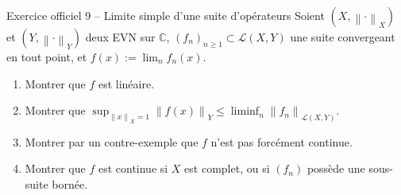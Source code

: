 \documentclass[11pt,a4paper]{article}
\newcommand{\C}{\mathbb{C}}
\newcommand{\norm}[1]{\left\|#1\right\|}
\newcommand{\Lc}{\mathcal{L}}
\theoremstyle{definition}
\begin{document}
\begin{exo}{Exercice officiel 9 -- Limite simple d'une suite d'opérateurs}
Soient $(X,\norm\cdot_X)$ et $(Y,\norm\cdot_Y)$ deux EVN sur $\C$, $(f_n)_{n\ge1}\subset\Lc(X,Y)$ une suite convergeant en tout point, et $f(x):=\lim_nf_n(x)$.
\begin{enumerate}[label=(\alph*)]
  \item Montrer que $f$ est linéaire.
  \item Montrer que $\sup_{\norm x_X=1}\norm{f(x)}_Y\le\liminf_n\norm{f_n}_{\Lc(X,Y)}$.
  \item Montrer par un contre-exemple que $f$ n'est pas forcément continue.
  \item Montrer que $f$ est continue si $X$ est complet, ou si $(f_n)$ possède une sous-suite bornée.
\end{enumerate}
\end{exo}
\end{document}
